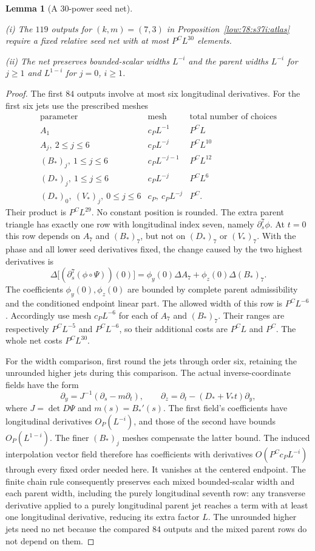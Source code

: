 \documentclass[11pt]{amsart}
\newtheorem{lemma}[theorem]{Lemma}
\theoremstyle{definition}
\theoremstyle{remark}
\numberwithin{equation}{section}
\begin{document}
\begin{lemma}[A $30$-power seed net]\label{low:78:s37i:collar-net}

\noindent\textup{(i)} The $119$ outputs for $(k,m)=(7,3)$ in Proposition~\ref{low:78:s37i:atlas} require a fixed relative seed net with at most $P^CL^{30}$ elements.

\noindent\textup{(ii)} The net preserves bounded-scalar widths $L^{-i}$ and the parent widths $L^{-i}$ for $j\ge1$ and $L^{1-i}$ for $j=0$, $i\ge1$.
\end{lemma}
\begin{proof}
The first $84$ outputs involve at most six longitudinal derivatives. For the first six jets use the prescribed meshes
\[
\begin{array}{c|c|c}
\text{parameter}&\text{mesh}&\text{total number of choices}\\\hline
A_1&c_PL^{-1}&P^CL\\
A_j,\ 2\le j\le6&c_PL^{-j}&P^CL^{10}\\
(B_*)_j,\ 1\le j\le6&c_PL^{-j-1}&P^CL^{12}\\
(D_*)_j,\ 1\le j\le6&c_PL^{-j}&P^CL^6\\
(D_*)_0,\ (V_*)_j,\ 0\le j\le6&c_P,\ c_PL^{-j}&P^C.
\end{array}
\]
Their product is $P^CL^{29}$. No constant position is rounded. The extra parent triangle has exactly one row with longitudinal index seven, namely $\partial_s^7\phi$. At $t=0$ this row depends on $A_7$ and $(B_*)_7$, but not on $(D_*)_7$ or $(V_*)_7$. With the phase and all lower seed derivatives fixed, the change caused by the two highest derivatives is
\[
\Delta\bigl[(\partial_s^7(\phi\circ\Psi))(0)\bigr]=\phi_y(0)\Delta A_7+\phi_z(0)\Delta(B_*)_7.
\]
The coefficients $\phi_y(0),\phi_z(0)$ are bounded by complete parent admissibility and the conditioned endpoint linear part. The allowed width of this row is $P^CL^{-6}$. Accordingly use mesh $c_PL^{-6}$ for each of $A_7$ and $(B_*)_7$. Their ranges are respectively $P^CL^{-5}$ and $P^CL^{-6}$, so their additional costs are $P^CL$ and $P^C$. The whole net costs $P^CL^{30}$.

For the width comparison, first round the jets through order six, retaining the unrounded higher jets during this comparison. The actual inverse-coordinate fields have the form
\[
\partial_y=J^{-1}(\partial_s-m\partial_t),\qquad \partial_z=\partial_t-(D_*+V_*t)\partial_y,
\]
where $J=\det D\Psi$ and $m(s)=B_*'(s)$. The first field's coefficients have longitudinal derivatives $O_P(L^{-i})$, and those of the second have bounds $O_P(L^{1-i})$. The finer $(B_*)_j$ meshes compensate the latter bound. The induced interpolation vector field therefore has coefficients with derivatives $O(P^Cc_PL^{-i})$ through every fixed order needed here. It vanishes at the centered endpoint. The finite chain rule consequently preserves each mixed bounded-scalar width and each parent width, including the purely longitudinal seventh row: any transverse derivative applied to a purely longitudinal parent jet reaches a term with at least one longitudinal derivative, reducing its extra factor $L$. The unrounded higher jets need no net because the compared $84$ outputs and the mixed parent rows do not depend on them.


\end{proof}
\end{document}
